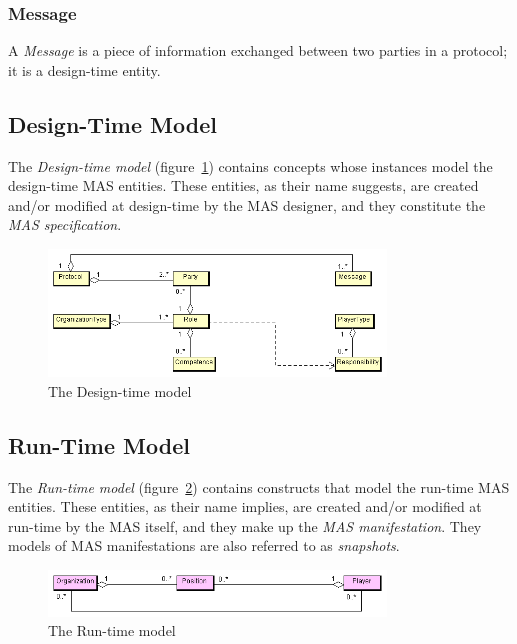 \subsubsection*{Message}

A \textit{Message} is a piece of information exchanged between two parties in a protocol; it is a design-time entity.

\subsection{Design-Time Model}	

The \textit{Design-time model} (figure~\ref{figure:thespian-design-time-model}) contains concepts whose instances model the design-time MAS entities.
These entities, as their name suggests, are created and/or modified at design-time by the MAS designer, and they constitute the \textit{MAS specification}.

\begin{figure}[ht]
	\centering
	\includegraphics[width=0.8\textwidth]{images/thespian/design-time-model.png}
	\caption{The Design-time model}
	\label{figure:thespian-design-time-model}
\end{figure}

\subsection{Run-Time Model}

The \textit{Run-time model} (figure~\ref{figure:thespian-run-time-metamodel}) contains constructs that model the run-time MAS entities.
These entities, as their name implies, are created and/or modified at run-time by the MAS itself, and they make up the \textit{MAS manifestation}.
They models of MAS manifestations are also referred to as \textit{snapshots}.

\begin{figure}[ht]
	\centering
	\includegraphics[width=0.8\textwidth]{images/thespian/run-time-model.png}
	\caption{The Run-time model}
	\label{figure:thespian-run-time-metamodel}
\end{figure}

